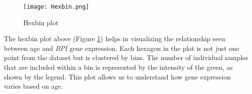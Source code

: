 \documentclass{article}
\begin{document}
\begin{figure}[h]
    \centering
    \texttt{[image: Hexbin.png]}
    \caption{Hexbin plot}
    \label{fig:hex}

\end{figure}

The hexbin plot above (Figure \ref{fig:hex}) helps in visualizing the relationship seen between age and \emph{BPI} gene expression. Each hexagon in the plot is not just one point from the dataset but is clustered by bins. The number of individual samples that are included within a bin is represented by the intensity of the green, as shown by the legend. This plot allows us to understand how gene expression varies based on age. 

\newpage



\end{document}
